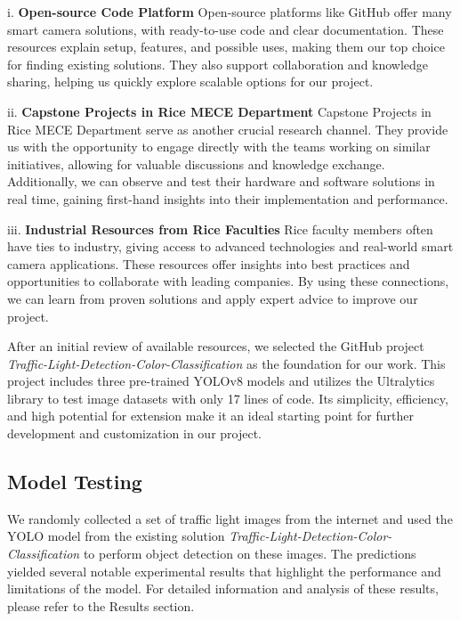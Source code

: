 \documentclass[journal,transmag]{IEEEtran}
\begin{document}
i. \textbf{Open-source Code Platform} Open-source platforms like GitHub offer many smart camera solutions, with ready-to-use code and clear documentation. These resources explain setup, features, and possible uses, making them our top choice for finding existing solutions. They also support collaboration and knowledge sharing, helping us quickly explore scalable options for our project.

ii. \textbf{Capstone Projects in Rice MECE Department} Capstone Projects in Rice MECE Department serve as another crucial research channel. They provide us with the opportunity to engage directly with the teams working on similar initiatives, allowing for valuable discussions and knowledge exchange. Additionally, we can observe and test their hardware and software solutions in real time, gaining first-hand insights into their implementation and performance.

iii. \textbf{Industrial Resources from Rice Faculties} Rice faculty members often have ties to industry, giving access to advanced technologies and real-world smart camera applications. These resources offer insights into best practices and opportunities to collaborate with leading companies. By using these connections, we can learn from proven solutions and apply expert advice to improve our project.

After an initial review of available resources, we selected the GitHub project \textit{Traffic-Light-Detection-Color-Classification} \cite{ExSolution} as the foundation for our work. This project includes three pre-trained YOLOv8 models and utilizes the Ultralytics library to test image datasets with only 17 lines of code. Its simplicity, efficiency, and high potential for extension make it an ideal starting point for further development and customization in our project.


\subsection{Model Testing}

We randomly collected a set of traffic light images from the internet and used the YOLO model from the existing solution \textit{Traffic-Light-Detection-Color-Classification} to perform object detection on these images. The predictions yielded several notable experimental results that highlight the performance and limitations of the model. For detailed information and analysis of these results, please refer to the Results section.
\end{document}
